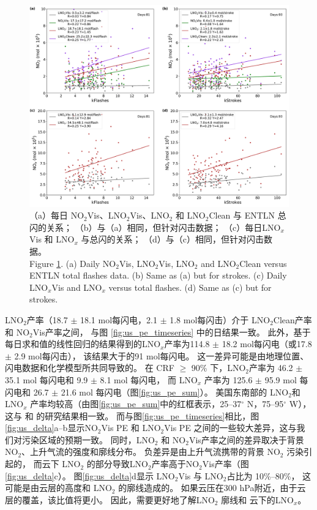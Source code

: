 \begin{figure}[!htbp]
    \includegraphics[width=15cm]{./figures/us_pe_linear.pdf}
    \caption{（a）每日 NO$_2$Vis、LNO$_2$Vis、LNO$_2$ 和 LNO$_2$Clean 与 ENTLN 总闪的关系；
    （b）与（a）相同，但针对闪击数据；
    （c）每日LNO$_x$Vis 和 LNO$_x$ 与总闪的关系；
    （d）与（c）相同，但针对闪击数据。\\
    Figure \ref{fig:us_pe_linear}.
    (a) Daily NO$_2$Vis, LNO$_2$Vis, LNO$_2$ and LNO$_2$Clean versus ENTLN total flashes data.
    (b) Same as (a) but for strokes.
    (c) Daily LNO$_x$Vis and LNO$_x$ versus total flashes.
    (d) Same as (c) but for strokes.}
    \label{fig:us_pe_linear}
\end{figure}

LNO$_2$产率（18.7 $\pm$ 18.1 mol每闪电，2.1 $\pm$ 1.8 mol每闪击）介于 LNO$_2$Clean产率 和 NO$_2$Vis产率之间，
与图 \ref{fig:us_pe_timeseries} 中的日结果一致。
此外，基于每日求和值的线性回归的结果得到的LNO$_x$产率为114.8 $\pm$ 18.2 mol每闪电（或17.8 $\pm$ 2.9 mol每闪击），
该结果大于\citet{Pickering.2016}的91 mol每闪电。
这一差异可能是由地理位置、闪电数据和化学模型所共同导致的。
在 CRF $\geq$ 90\% 下，LNO$_2$产率为 46.2 $\pm$ 35.1 mol 每闪电和 9.9 $\pm$ 8.1 mol 每闪电，
而 LNO$_x$ 产率为 125.6 $\pm$ 95.9 mol 每闪电和 26.7 $\pm$ 21.6 mol 每闪电（图\ref{fig:us_pe_sum}）。
美国东南部的 LNO$_2$和 LNO$_x$ 产率均较高（由图\ref{fig:us_pe_sum}中的红框表示，25--37$^{\circ}$ N，75--95$^{\circ}$ W），这与\citet{Lapierre.2020} 和 \citet{Bucsela.2019}的研究结果相一致。
而与图\ref{fig:us_pe_timeseries}相比，图\ref{fig:us_delta}a--b显示NO$_2$Vis PE 和 LNO$_2$Vis PE 之间的一些较大差异，这与我们对污染区域的预期一致。
同时，LNO$_2$ 和 NO$_2$Vis产率之间的差异取决于背景 NO$_2$、上升气流的强度和廓线分布。
负差异是由上升气流携带的背景 NO$_2$ 污染引起的，
而云下 LNO$_2$ 的部分导致LNO$_2$产率高于NO$_2$Vis产率（图\ref{fig:us_delta}c）。
图\ref{fig:us_delta}d显示 LNO$_2$Vis 与 LNO$_2$占比为 10\%--80\%，
这可能是由云层的高度和 LNO$_2$ 的廓线造成的。
如果云压在300 hPa附近，由于云层的覆盖，该比值将更小。
因此，需要更好地了解LNO$_2$ 廓线和 云下的LNO$_x$。


